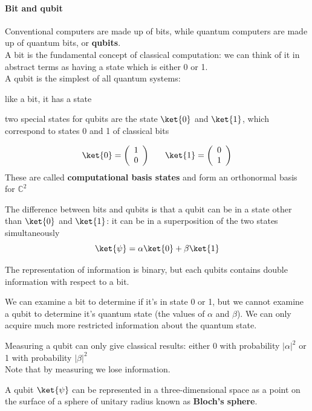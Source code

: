 \documentclass[10pt]{report}
\begin{document}
\paragraph{Bit and qubit} Conventional computers are made up of bits, while quantum computers are made up of quantum bits, or \textbf{qubits}.\\
A bit is the fundamental concept of classical computation: we can think of it in abstract terms as having a state which is either 0 or 1.\\
A qubit is the simplest of all quantum systems:
\begin{list}{}{}
	\item like a bit, it has a state
	\item two special states for qubits are the state $\ket{0}$ and $\ket{1}$, which correspond to states 0 and 1 of classical bits
	
$$\ket{0} = \left(\begin{array}{c}
	1\\0
	\end{array}\right)\:\:\:\:\:\:\:\:\ket{1} = \left(\begin{array}{c}
	0\\1
	\end{array}\right)$$
	These are called \textbf{computational basis states} and form an orthonormal basis for $\mathbb{C}^2$
	\item The difference between bits and qubits is that a qubit can be in a state other than $\ket{0}$ and $\ket{1}$: it can be in a superposition of the two states simultaneously
	$$\ket{\psi} = \alpha\ket{0}+\beta\ket{1}$$
	\item The representation of information is binary, but each qubits contains double information with respect to a bit.
	\item We can examine a bit to determine if it's in state 0 or 1, but we cannot examine a qubit to determine it's quantum state (the values of $\alpha$ and $\beta$). We can only acquire much more restricted information about the quantum state.
	\item Measuring a qubit can only give classical results: either 0 with probability $|\alpha|^2$ or 1 with probability $|\beta|^2$\\
	Note that by measuring we lose information.
	\item A qubit $\ket{\psi}$ can be represented in a three-dimensional space as a point on the surface of a sphere of unitary radius known as \textbf{Bloch's sphere}.
\end{list}
\end{document}
